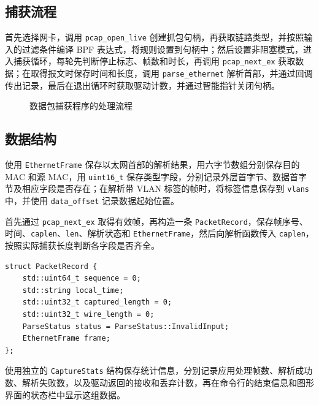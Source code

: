 \documentclass[UTF8,a4paper,11pt,scheme=chinese]{ctexart}
\newcommand{\code}[1]{\texttt{#1}}
\begin{document}
\subsection{捕获流程}
首先选择网卡，调用 \code{pcap\_open\_live} 创建抓包句柄，再获取链路类型，并按照输入的过滤条件编译 BPF 表达式，将规则设置到句柄中；然后设置非阻塞模式，进入捕获循环，每轮先判断停止标志、帧数和时长，再调用 \code{pcap\_next\_ex} 获取数据；在取得报文时保存时间和长度，调用 \code{parse\_ethernet} 解析首部，并通过回调传出记录，最后在退出循环时获取驱动计数，并通过智能指针关闭句柄。
\begin{figure}[H]\centering
{}
\caption{数据包捕获程序的处理流程}\end{figure}

\subsection{数据结构}
使用 \code{EthernetFrame} 保存以太网首部的解析结果，用六字节数组分别保存目的 MAC 和源 MAC，用 \code{uint16\_t} 保存类型字段，分别记录外层首字节、数据首字节及相应字段是否存在；在解析带 VLAN 标签的帧时，将标签信息保存到 \code{vlans} 中，并使用 \code{data\_offset} 记录数据起始位置。

首先通过 \code{pcap\_next\_ex} 取得有效帧，再构造一条 \code{PacketRecord}，保存帧序号、时间、\code{caplen}、\code{len}、解析状态和 \code{EthernetFrame}，然后向解析函数传入 \code{caplen}，按照实际捕获长度判断各字段是否齐全。
\begin{lstlisting}
struct PacketRecord {
    std::uint64_t sequence = 0;
    std::string local_time;
    std::uint32_t captured_length = 0;
    std::uint32_t wire_length = 0;
    ParseStatus status = ParseStatus::InvalidInput;
    EthernetFrame frame;
};
\end{lstlisting}

使用独立的 \code{CaptureStats} 结构保存统计信息，分别记录应用处理帧数、解析成功数、解析失败数，以及驱动返回的接收和丢弃计数，再在命令行的结束信息和图形界面的状态栏中显示这组数据。
\end{document}
